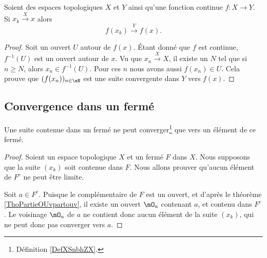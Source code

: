 \begin{proposition}	\label{PROPooFSRRooYNNTvj}
	Soient des espaces topologiques \( X\) et \( Y\) ainsi qu'une fonction continue \(f \colon X\to Y  \). Si \( x_k\stackrel{ X}{\longrightarrow} x\) alors
	\begin{equation}
		f(x_k)\stackrel{ Y}{\longrightarrow} f(x).
	\end{equation}
\end{proposition}

\begin{proof}
	Soit un ouvert \( U\) autour de \( f(x)\). Étant donné que \( f\) est continue, \( f^{-1}(U)\) est un ouvert autour de \( x\). Vu que \( x_n\stackrel{ X}{\longrightarrow} X\), il existe un \( N\) tel que si \( n\geq N\), alors \( x_n\in f^{-1}(U)\). Pour ces \( n\) nous avons aussi \( f(x_n)\in U\). Cela prouve que \( (f(x_n))_{n\in \eN}\) est une suite convergente dans \( Y\) vers \( f(x)\).
\end{proof}


\subsection{Convergence dans un fermé}

\begin{proposition}      \label{PROPooBBNSooCjrtRb}
	Une suite contenue dans un fermé ne peut converger\footnote{Définition \ref{DefXSnbhZX}.} que vers un élément de ce fermé.
\end{proposition}

\begin{proof}
	Soient un espace topologique \( X\) et un fermé \( F\) dans \( X\). Nous supposons que la suite \( (x_k)\) soit contenue dans \( F\). Nous allons prouver qu'aucun élément de \( F^c\) ne peut être limite.

	Soit \( a \in F^c\). Puisque le complémentaire de \( F\) est un ouvert, et d'après le théorème \ref{ThoPartieOUvpartouv}, il existe un ouvert \( \mO_a\) contenant \( a\), et contenu dans \( F^c\). Le voisinage \( \mO_a\) de \( a\) ne contient donc aucun élément de la suite \( (x_k)\), qui ne peut donc pas converger vers \( a\).
\end{proof}


